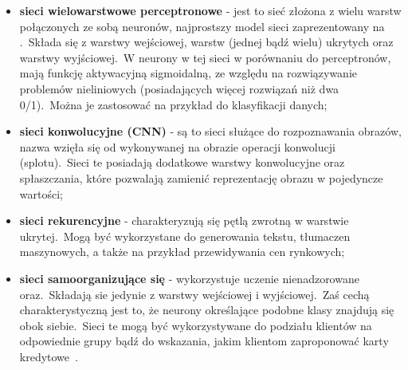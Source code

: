 \begin{itemize}
    \item \textbf{sieci wielowarstwowe perceptronowe} - jest to sieć złożona z wielu warstw połączonych ze sobą neuronów, najprostszy model sieci zaprezentowany na .\ Składa się z warstwy wejściowej, warstw (jednej bądź wielu) ukrytych oraz warstwy wyjściowej.\ W neurony w tej sieci w porównaniu do perceptronów, mają funkcję aktywacyjną sigmoidalną, ze względu na rozwiązywanie problemów nieliniowych (posiadających więcej rozwiązań niż dwa 0/1).\ Można je zastosować na przykład do klasyfikacji danych;
    \item \textbf{sieci konwolucyjne (CNN)} - są to sieci służące do rozpoznawania obrazów, nazwa wzięła się od wykonywanej na obrazie operacji konwolucji (splotu).\ Sieci te posiadają dodatkowe warstwy konwolucyjne oraz spłaszczania, które pozwalają zamienić reprezentację obrazu w pojedyncze wartości;
    \item \textbf{sieci rekurencyjne} - charakteryzują się pętlą zwrotną w warstwie ukrytej.\ Mogą być wykorzystane do generowania tekstu, tłumaczen maszynowych, a także na przykład przewidywania cen rynkowych;
    \item \textbf{sieci samoorganizujące się} - wykorzystuje uczenie nienadzorowane oraz.\ Składają sie jedynie z warstwy wejściowej i wyjściowej.\ Zaś cechą charakterystyczną jest to, że neurony określające podobne klasy znajdują się obok siebie.\ Sieci te mogą być wykorzystywane do podziału klientów na odpowiednie grupy bądź do wskazania, jakim klientom zaproponować karty kredytowe~\cite{IBMNetwork, BartosSOM}.
\end{itemize}


